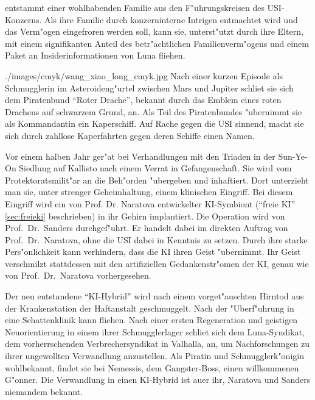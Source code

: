 \newpage
{}

\xls{} entstammt einer wohlhabenden Familie aus den F"uhrungskreisen des USI-Konzerns. Als ihre Familie durch konzerninterne Intrigen entmachtet wird und das Verm"ogen eingefroren werden soll, kann sie, unterst"utzt durch ihre Eltern, mit einem signifikanten Anteil des betr"achtlichen Familienverm"ogens und einem Paket an Insiderinformationen von Luna fliehen.

\begin{sideimagebox}[r]{0.64}{./images/cmyk/wang_xiao_long_cmyk.jpg}{}
    Nach einer kurzen Episode als Schmugglerin im Asteroideng"urtel zwischen Mars und Jupiter schlie\3t sie sich dem Piratenbund ``Roter Drache'', bekannt durch das Emblem eines roten Drachens auf schwarzem Grund, an. Als Teil des Piratenbundes "ubernimmt sie als Kommandantin ein Kaperschiff. Auf Rache gegen die USI sinnend, macht sie sich durch zahllose Kaperfahrten gegen deren Schiffe einen Namen.

    Vor einem halben Jahr ger"at \xls{} bei Verhandlungen mit den Triaden in der Sun-Ye-On Siedlung auf Kallisto nach einem Verrat in Gefangenschaft. Sie wird vom Protektoratsmilit"ar an die Beh"orden "ubergeben und inhaftiert. Dort unterzieht man sie, unter strenger Geheimhaltung, einem klinischen Eingriff. Bei diesem Eingriff wird ein von Prof. Dr. Naratova entwickelter KI-Symbiont (``freie KI'' \cref{sec:freieki} beschrieben) in ihr Gehirn implantiert. Die Operation wird von Prof.~Dr.~Sanders durchgef"uhrt. Er handelt dabei im direkten Auftrag von Prof.~Dr.~Naratova, ohne die USI dabei in Kenntnis zu setzen. Durch ihre starke Pers"onlichkeit kann \xls{} verhindern, dass die KI ihren Geist "ubernimmt. Ihr Geist verschmilzt stattdessen mit den artifiziellen Gedankenstr"omen der KI, genau wie von Prof.~Dr.~Naratova vorhergesehen.
\end{sideimagebox}

Der neu entstandene ``KI-Hybrid'' wird nach einem vorget"auschten Hirntod aus der Krankenstation der Haftanstalt geschmuggelt. Nach der "Uberf"uhrung in eine Schattenklinik kann \xl{} fliehen. Nach einer ersten Regeneration und geistigen Neuorientierung in einem ihrer Schmugglerlager schlie\3t sich \xl{} dem Luna-Syndikat, dem vorherrschenden Verbrechersyndikat in Valhalla, an, um Nachforschungen zu ihrer ungewollten Verwandlung anzustellen. Als Piratin und Schmugglerk"onigin wohlbekannt, findet sie bei Nemessis, dem Gangster-Boss, einen willkommenen G"onner. Die Verwandlung in einen KI-Hybrid ist au\3er ihr, Naratova und Sanders niemandem bekannt.

